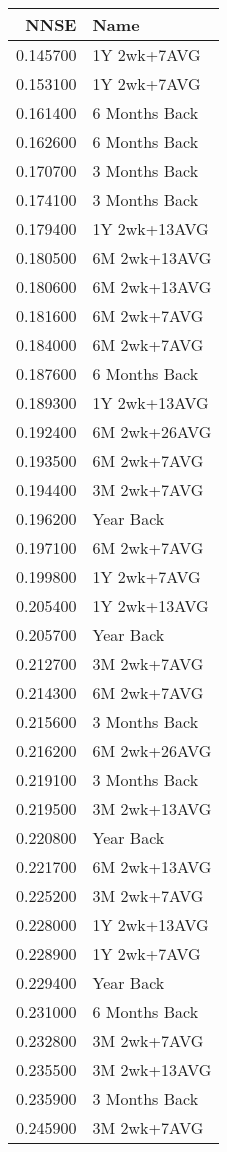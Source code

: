 \begin{tabular}{rl}
NNSE & Name \\
\hline
0.145700 & 1Y 2wk+7AVG \\
0.153100 & 1Y 2wk+7AVG \\
0.161400 & 6 Months Back \\
0.162600 & 6 Months Back \\
0.170700 & 3 Months Back \\
0.174100 & 3 Months Back \\
0.179400 & 1Y 2wk+13AVG \\
0.180500 & 6M 2wk+13AVG \\
0.180600 & 6M 2wk+13AVG \\
0.181600 & 6M 2wk+7AVG \\
0.184000 & 6M 2wk+7AVG \\
0.187600 & 6 Months Back \\
0.189300 & 1Y 2wk+13AVG \\
0.192400 & 6M 2wk+26AVG \\
0.193500 & 6M 2wk+7AVG \\
0.194400 & 3M 2wk+7AVG \\
0.196200 & Year Back \\
0.197100 & 6M 2wk+7AVG \\
0.199800 & 1Y 2wk+7AVG \\
0.205400 & 1Y 2wk+13AVG \\
0.205700 & Year Back \\
0.212700 & 3M 2wk+7AVG \\
0.214300 & 6M 2wk+7AVG \\
0.215600 & 3 Months Back \\
0.216200 & 6M 2wk+26AVG \\
0.219100 & 3 Months Back \\
0.219500 & 3M 2wk+13AVG \\
0.220800 & Year Back \\
0.221700 & 6M 2wk+13AVG \\
0.225200 & 3M 2wk+7AVG \\
0.228000 & 1Y 2wk+13AVG \\
0.228900 & 1Y 2wk+7AVG \\
0.229400 & Year Back \\
0.231000 & 6 Months Back \\
0.232800 & 3M 2wk+7AVG \\
0.235500 & 3M 2wk+13AVG \\
0.235900 & 3 Months Back \\
0.245900 & 3M 2wk+7AVG \\

\end{tabular}
